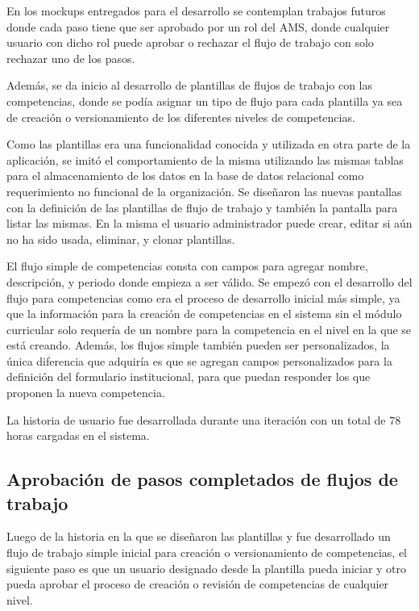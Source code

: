 En los mockups entregados para el desarrollo se contemplan trabajos futuros donde cada paso tiene que ser aprobado por un rol del AMS, donde cualquier usuario con dicho rol puede aprobar o rechazar el flujo de trabajo con solo rechazar uno de los pasos. 

Además, se da inicio al desarrollo de plantillas de flujos de trabajo con las competencias, donde se podía asignar un tipo de flujo para cada plantilla ya sea de creación o versionamiento de los diferentes niveles de competencias.

Como las plantillas era una funcionalidad conocida y utilizada en otra parte de la aplicación, se imitó el comportamiento de la misma utilizando las mismas tablas para el almacenamiento de los datos en la base de datos relacional como requerimiento no funcional de la organización. Se diseñaron las nuevas pantallas con la definición de las plantillas de flujo de trabajo y también la pantalla para listar las mismas. En la misma el usuario administrador puede crear, editar si aún no ha sido usada, eliminar, y clonar plantillas.

El flujo simple de competencias consta con campos para agregar nombre, descripción, y periodo donde empieza a ser válido. Se empezó con el desarrollo del flujo para competencias como era el proceso de desarrollo inicial más simple, ya que la información para la creación de competencias en el sistema sin el módulo curricular solo requería de un nombre para la competencia en el nivel en la que se está creando. Además, los flujos simple también pueden ser personalizados, la única diferencia que adquiría es que se agregan campos personalizados para la definición del formulario institucional, para que puedan responder los que proponen la nueva competencia.

La historia de usuario fue desarrollada durante una iteración con un total de 78 horas cargadas en el sistema.

\subsection{Aprobación de pasos completados de flujos de trabajo}

Luego de la historia en la que se diseñaron las plantillas y fue desarrollado un flujo de trabajo simple inicial para creación o versionamiento de competencias, el siguiente paso es que un usuario designado desde la plantilla pueda iniciar y otro pueda aprobar el proceso de creación o revisión de competencias de cualquier nivel.

